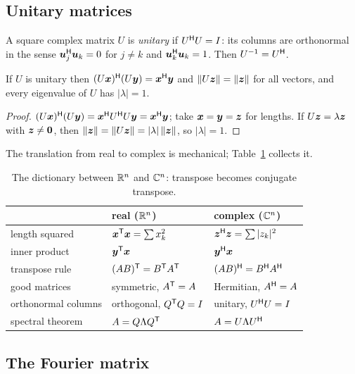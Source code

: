 \subsection{Unitary matrices}

\begin{definition}\label{def:u30-unitary}
A square complex matrix $U$ is \emph{unitary} if $U^{\mathsf{H}} U=I$: its columns are orthonormal in the
sense $\boldsymbol{u}_j^{\mathsf{H}}\boldsymbol{u}_k=0$ for $j\ne k$ and $\boldsymbol{u}_k^{\mathsf{H}}\boldsymbol{u}_k=1$. Then $U^{-1}=U^{\mathsf{H}}$.
\end{definition}

\begin{proposition}\label{prop:u30-unitary}
If $U$ is unitary then $(U\boldsymbol{x})^{\mathsf{H}}(U\boldsymbol{y})=\boldsymbol{x}^{\mathsf{H}}\boldsymbol{y}$ and $\|U\boldsymbol{z}\|=\|\boldsymbol{z}\|$ for all vectors, and
every eigenvalue of $U$ has $|\lambda|=1$.
\end{proposition}
\begin{proof}
$(U\boldsymbol{x})^{\mathsf{H}}(U\boldsymbol{y})=\boldsymbol{x}^{\mathsf{H}} U^{\mathsf{H}} U\boldsymbol{y}=\boldsymbol{x}^{\mathsf{H}}\boldsymbol{y}$; take $\boldsymbol{x}=\boldsymbol{y}=\boldsymbol{z}$ for lengths. If
$U\boldsymbol{z}=\lambda\boldsymbol{z}$ with $\boldsymbol{z}\ne\boldsymbol{0}$, then $\|\boldsymbol{z}\|=\|U\boldsymbol{z}\|=|\lambda|\,\|\boldsymbol{z}\|$, so $|\lambda|=1$.
\end{proof}

The translation from real to complex is mechanical; Table~\ref{tab:u30-dictionary} collects it.

\begin{table}[ht]\centering
\begin{tabular}{@{}lll@{}}
\toprule
 & real ($\mathbb{R}^n$) & complex ($\mathbb{C}^n$) \\
\midrule
length squared & $\boldsymbol{x}^{\mathsf{T}}\boldsymbol{x}=\sum x_k^2$ & $\boldsymbol{z}^{\mathsf{H}}\boldsymbol{z}=\sum |z_k|^2$ \\
inner product & $\boldsymbol{y}^{\mathsf{T}}\boldsymbol{x}$ & $\boldsymbol{y}^{\mathsf{H}}\boldsymbol{x}$ \\
transpose rule & $(AB)^{\mathsf{T}}=B^{\mathsf{T}} A^{\mathsf{T}}$ & $(AB)^{\mathsf{H}}=B^{\mathsf{H}} A^{\mathsf{H}}$ \\
good matrices & symmetric, $A^{\mathsf{T}}=A$ & Hermitian, $A^{\mathsf{H}}=A$ \\
orthonormal columns & orthogonal, $Q^{\mathsf{T}} Q=I$ & unitary, $U^{\mathsf{H}} U=I$ \\
spectral theorem & $A=Q\Lambda Q^{\mathsf{T}}$ & $A=U\Lambda U^{\mathsf{H}}$ \\
\bottomrule
\end{tabular}
\caption{The dictionary between $\mathbb{R}^n$ and $\mathbb{C}^n$: transpose becomes conjugate transpose.}
\label{tab:u30-dictionary}
\end{table}

\subsection{The Fourier matrix}

